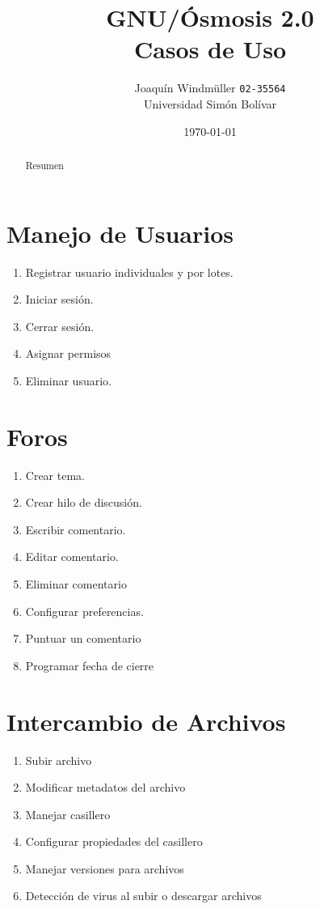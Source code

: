 \documentclass{article}
\begin{document}
\title{GNU/Ósmosis 2.0 \\ Casos de Uso}
\author{Joaquín Windmüller \texttt{02-35564} \\
		Universidad Simón Bolívar}
\date{\today}  %
\maketitle

\begin{abstract}
Resumen
\end{abstract}

\pagebreak
\tableofcontents
\pagebreak



\section{Manejo de Usuarios}
\begin{enumerate} 
	\item Registrar usuario individuales y por lotes.
	\item Iniciar sesión.
	\item Cerrar sesión.
	\item Asignar permisos
	\item Eliminar usuario.
\end{enumerate}

\section{Foros}
\begin{enumerate}
	\item Crear tema.
	\item Crear hilo de discusión.
	\item Escribir comentario.
	\item Editar comentario.
	\item Eliminar comentario
	\item Configurar preferencias.
	\item Puntuar un comentario
	\item Programar fecha de cierre
\end{enumerate}

\section{Intercambio de Archivos}
\begin{enumerate}
	\item Subir archivo
	\item Modificar metadatos del archivo
	\item Manejar casillero
	\item Configurar propiedades del casillero
	\item Manejar versiones para archivos
  	\item Detección de virus al subir o descargar archivos
\end{enumerate}
\end{document}

